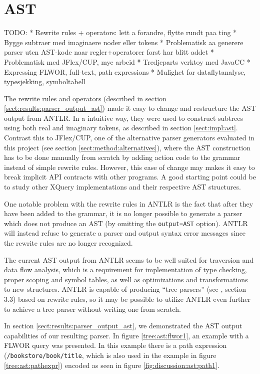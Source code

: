 \section{AST}
TODO:
 * Rewrite rules + operators: lett a forandre, flytte rundt paa ting
 * Bygge subtraer med imaginaere noder eller tokens
 * Problematisk aa generere parser uten AST-kode naar regler+operatorer forst har
   blitt addet
 * Problematisk med JFlex/CUP, mye arbeid
 * Tredjeparts verktoy med JavaCC
 * Expressing FLWOR, full-text, path expressions
 * Mulighet for dataflytanalyse, typesjekking, symboltabell
 
The rewrite rules and operators (described in section
\ref{sect:results:parser_output_ast}) made it easy to change and restructure the
AST output from ANTLR. In a intuitive way, they were used to construct subtrees
using both real and imaginary tokens, as described in section
\ref{sect:impl:ast}. Contrast this to JFlex/CUP, one of the alternative
parser generators evaluated in this project (see section
\ref{sect:method:alternatives}), where the AST construction has to be done
manually from scratch by adding action code to the grammar instead of simple
rewrite rules. However, this ease of change may makes it easy to break implicit
API contracts with other programs. A good starting point could be to study other
XQuery implementations and their respective AST structures. 

One notable problem with the rewrite rules in ANTLR is the fact that after they
have been added to the grammar, it is no longer possible to generate a parser
which does not produce an AST (by omitting the \verb!output=AST! option). ANTLR will
instead refuse to generate a parser and output syntax error messages since the rewrite
rules are no longer recognized.

The current AST output from ANTLR seems to be well suited for traversion and data
flow analysis, which is a requirement for implementation of type checking,
proper scoping and symbol tables, as well as optimizations and transformations
to new structures. ANTLR is capable of producing ``tree parsers'' (see
\cite{definitiveAntlr}, section 3.3) based on rewrite rules, so it may be
possible to utilize ANTLR even further to achieve a tree
parser without writing one from scratch.

In section \ref{sect:results:parser_output_ast}, we demonstrated the AST output
capabilities of our resulting parser. In figure \ref{tree:ast:flwor1}, an
example with a FLWOR query was presented. In this example there is a path
expression (\verb!/bookstore/book/title!, which is also used in the example in
figure \ref{tree:ast:pathexpr}) encoded as seen in figure
\ref{fig:discussion:ast:path1}. 

